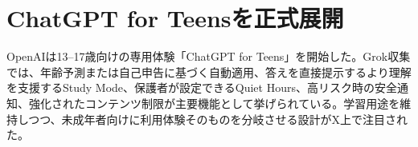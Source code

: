 \section{ChatGPT for Teensを正式展開}
OpenAIは13--17歳向けの専用体験「ChatGPT for Teens」を開始した。Grok収集では、年齢予測または自己申告に基づく自動適用、答えを直接提示するより理解を支援するStudy Mode、保護者が設定できるQuiet Hours、高リスク時の安全通知、強化されたコンテンツ制限が主要機能として挙げられている。学習用途を維持しつつ、未成年者向けに利用体験そのものを分岐させる設計がX上で注目された。
